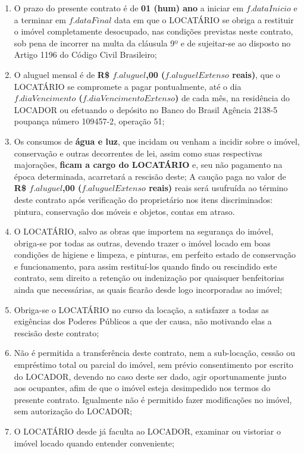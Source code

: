 \documentclass[a4paper,12pt]{article}
\begin{document}
\begin{enumerate}

\item O prazo do presente contrato é de \textbf{01 (hum) ano} a iniciar em ${f.dataInicio}$
e a terminar em ${f.dataFinal}$ data em que o LOCATÁRIO
se obriga a restituir o imóvel completamente desocupado, nas condições previstas neste contrato,
sob pena de incorrer na multa da cláusula 9º e de sujeitar-se ao disposto no Artigo 1196 do Código Civil Brasileiro;
\item O aluguel mensal é de \textbf{R\$ ${f.aluguel}$,00 (${f.aluguelExtenso}$  reais)},
que o LOCATÁRIO se compromete a pagar pontualmente, até o dia \textbf{${f.diaVencimento}$  (${f.diaVencimentoExtenso}$)}
de cada mês, na residência do LOCADOR ou efetuando o depósito no Banco do Brasil Agência 2138-5 poupança número 109457-2, operação 51;
\item Os consumos de \textbf{água e luz}, que incidam ou venham a incidir sobre o imóvel, conservação e outras decorrentes de lei, assim como suas respectivas majorações, \textbf{ficam a cargo do LOCATÁRIO} e, seu não pagamento na época determinada, acarretará a rescisão deste; A caução paga no valor de \textbf{R\$ ${f.aluguel}$,00 (${f.aluguelExtenso}$  reais)} reais será usufruída ao término deste contrato após verificação do proprietário nos itens discriminados: pintura, conservação dos móveis e objetos, contas em atraso.
\item O LOCATÁRIO, salvo as obras que importem na segurança do imóvel, obriga-se por todas as outras, devendo trazer o imóvel locado em boas condições de higiene e limpeza, e pinturas, em perfeito estado de conservação e funcionamento, para assim restituí-los quando findo ou rescindido este contrato, sem direito a retenção ou indenização por quaisquer benfeitorias ainda que necessárias, as quais ficarão desde logo incorporadas ao imóvel;
\item Obriga-se o LOCATÁRIO no curso da locação, a satisfazer a todas as exigências dos Poderes Públicos a que der causa, não motivando elas a rescisão deste contrato;
\item Não é permitida a transferência deste contrato, nem a sub-locação, cessão ou empréstimo total ou parcial do imóvel, sem prévio consentimento por escrito do LOCADOR, devendo no caso deste ser dado, agir oportunamente junto aos ocupantes, afim de que o imóvel esteja desimpedido nos termos do presente contrato. Igualmente não é permitido fazer modificações no imóvel, sem autorização do LOCADOR;
\item O LOCATÁRIO desde já faculta ao LOCADOR, examinar ou vistoriar o imóvel locado quando entender conveniente;

\end{enumerate}
\end{document}
